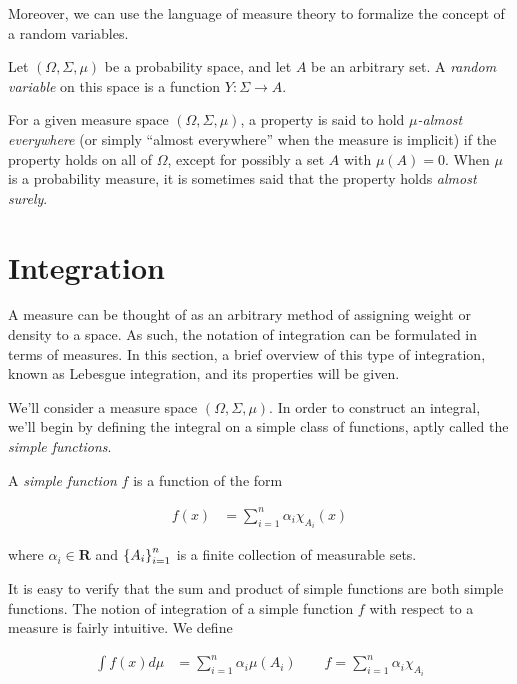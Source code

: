 Moreover, we can use the language of measure theory to formalize the
concept of a random variables.

\begin{definition}\label{def:random-variable}
  Let $(\Omega, \Sigma, \mu)$ be a probability space, and let $A$ be
  an arbitrary set. A \emph{random variable} on this space is a
  function $Y:\Sigma\to A$.
\end{definition}

For a given measure space $(\Omega, \Sigma, \mu)$, a property is said
to hold \emph{$\mu$-almost everywhere} (or simply ``almost
everywhere'' when the measure is implicit) if the property holds on
all of $\Omega$, except for possibly a set $A$ with $\mu(A) = 0$. When
$\mu$ is a probability measure, it is sometimes said that the property
holds \emph{almost surely}.

\section{Integration}\label{app:measure:integration}
A measure can be thought of as an arbitrary method of assigning weight
or density to a space. As such, the notation of integration can be
formulated in terms of measures. In this section, a brief overview of
this type of integration, known as Lebesgue integration, and its properties will be given.

We'll consider a measure space $(\Omega, \Sigma, \mu)$. In order to
construct an integral, we'll begin by defining the integral on a
simple class of functions, aptly called the \emph{simple functions}.

\begin{definition}\label{def:simple-function}
  A \emph{simple function} $f$ is a function of the form

  \begin{align*}
    f(x) &= \sum_{i=1}^n\alpha_i\chi_{A_i}(x)
  \end{align*}

  where $\alpha_i\in\mathbf{R}$ and $\indexedint{i}{n}{A}$ is a finite
  collection of measurable sets.
\end{definition}

It is easy to verify that the sum and product of simple functions are
both simple functions. The notion of integration of a simple function
$f$ with respect to a measure is fairly intuitive. We define

\begin{align*}
  \int f(x)d\mu &= \sum_{i=1}^n\alpha_i\mu(A_i)\qquad f = \sum_{i=1}^n\alpha_i\chi_{A_i}
\end{align*}

